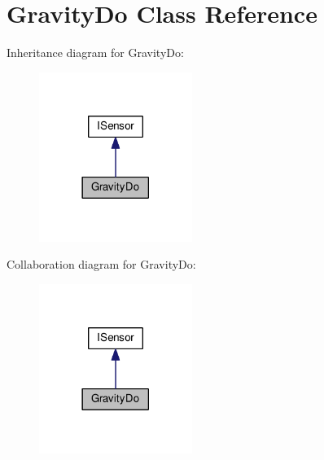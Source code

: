 \hypertarget{class_gravity_do}{}\section{Gravity\+Do Class Reference}
\label{class_gravity_do}


Inheritance diagram for Gravity\+Do\+:\nopagebreak
\begin{figure}[H]
\begin{center}
\leavevmode
\includegraphics[width=141pt]{class_gravity_do__inherit__graph}
\end{center}
\end{figure}


Collaboration diagram for Gravity\+Do\+:\nopagebreak
\begin{figure}[H]
\begin{center}
\leavevmode
\includegraphics[width=141pt]{class_gravity_do__coll__graph}
\end{center}
\end{figure}
